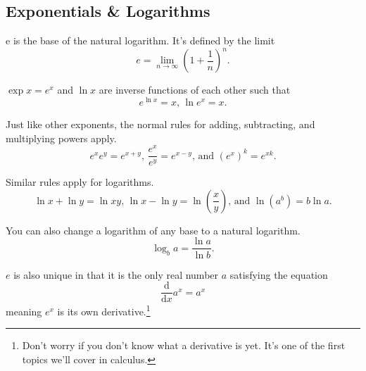 \subsection{Exponentials \& Logarithms}
\begin{definition}
	e is the base of the natural logarithm. It's defined by the limit
	\begin{equation*}
		e = \lim\limits_{n\rightarrow\infty}{\left(1+\frac{1}{n}\right)^n}.
	\end{equation*}
\end{definition}


$\exp{x} = e^x$ and $\ln{x}$ are inverse functions of each other such that
\begin{equation*}
	e^{\ln{x}} = x \text{, } \ln{e^x} = x.
\end{equation*}


Just like other exponents, the normal rules for adding, subtracting, and multiplying powers apply.
\begin{equation*}
	e^xe^y = e^{x+y}\text{, }\frac{e^x}{e^y}=e^{x-y}\text{, and }\left(e^x\right)^k=e^{xk}.
\end{equation*}


Similar rules apply for logarithms.
\begin{equation*}
	\ln{x}+\ln{y} = \ln{xy}\text{, }\ln{x}-\ln{y} = \ln{\left(\frac{x}{y}\right)}\text{, and }\ln{\left(a^b\right)}=b\ln{a}.
\end{equation*}


You can also change a logarithm of any base to a natural logarithm.
\begin{equation*}
	\log_{b}{a} = \frac{\ln{a}}{\ln{b}}.
\end{equation*}


$e$ is also unique in that it is the only real number $a$ satisfying the equation
\begin{equation*}
	\frac{\mathrm{d}}{\mathrm{d}x}a^x = a^x
\end{equation*}
meaning $e^x$ is its own derivative.\footnote{Don't worry if you don't know what a derivative is yet. It's one of the first topics we'll cover in calculus.}